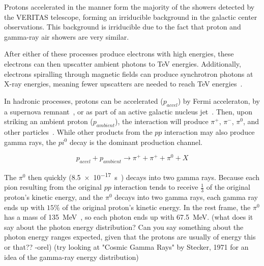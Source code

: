 

  Protons accelerated in the manner form the majority of the showers detected by the VERITAS telescope, forming an irriducible background in the galactic center observations.
  This background is irriducible due to the fact that proton and gamma-ray air showers are very similar.
  
  After either of these processes produce electrons with high energies, these electrons can then upscatter ambient photons to TeV energies.
  Additionally, electrons spiralling through magnetic fields can produce synchrotron photons at X-ray energies, meaning fewer upscatters are needed to reach TeV energies~\cite{self_compton}.

  In hadronic processes, protons can be accelerated ($p_{accel}$) by Fermi acceleraton, by a supernova remnant~\cite{proton_snr_accel}, or as part of an active galactic nucleus jet~\cite{hadronic1,hadronic2}.
  Then, upon striking an ambient proton ($p_{ambient}$), the interaction will produce $\pi^{+}$, $\pi^{-}$, $\pi^{0}$, and other particles~\cite{pp_pion,pp_pion2,pp_pion3}.
  While other products from the $pp$ interaction may also produce gamma rays, the $pi^0$ decay is the dominant production channel.
  
  \begin{equation}\nonumber
    p_{accel} + p_{ambient} \rightarrow \pi^+ + \pi^+ + \pi^0 + X
  \end{equation}

  The $\pi^{0}$ then quickly (\SI{8.5e-17}{s}~\cite{pdg2016}) decays into two gamma rays.
  Because each pion resulting from the original $pp$ interaction tends to receive $\frac{1}{3}$ of the original proton's kinetic energy, and the $\pi^0$ decays into two gamma rays, each gamma ray ends up with \nicetilde$15\%$ of the original proton's kinetic energy.
  In the rest frame, the $\pi^0$ has a mass of \SI{135}{\MeV}~\cite{pdg2016}, so each photon ends up with \SI{67.5}{\MeV}.
  {\color{red}(what does it say about the photon energy distribution? Can you say something about the photon energy ranges expected, given that the protons are usually of energy this or that?? -orel) (try looking at "Cosmic Gamma Rays" by Stecker, 1971 for an idea of the gamma-ray energy distribution)}
  
